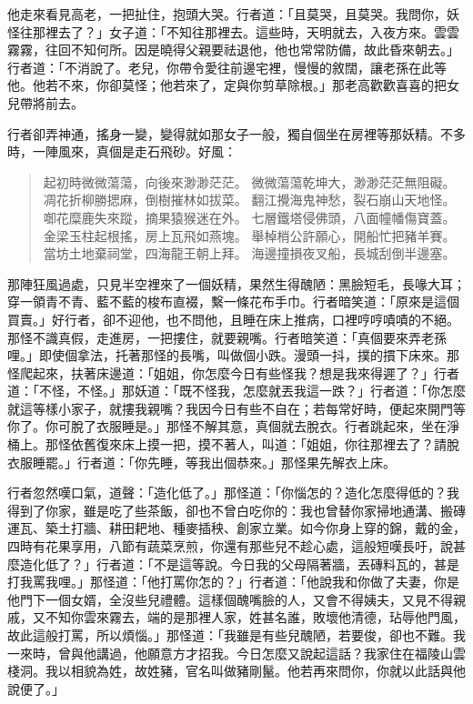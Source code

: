 他走來看見高老，一把扯住，抱頭大哭。行者道：「且莫哭，且莫哭。我問你，妖怪往那裡去了？」女子道：「不知往那裡去。這些時，天明就去，入夜方來。雲雲霧霧，往回不知何所。因是曉得父親要祛退他，他也常常防備，故此昏來朝去。」行者道：「不消說了。老兒，你帶令愛往前邊宅裡，慢慢的敘闊，讓老孫在此等他。他若不來，你卻莫怪；他若來了，定與你剪草除根。」那老高歡歡喜喜的把女兒帶將前去。

行者卻弄神通，搖身一變，變得就如那女子一般，獨自個坐在房裡等那妖精。不多時，一陣風來，真個是走石飛砂。好風：
\begin{quote}
起初時微微蕩蕩，向後來渺渺茫茫。
微微蕩蕩乾坤大，渺渺茫茫無阻礙。
凋花折柳勝揌麻，倒樹摧林如拔菜。
翻江攪海鬼神愁，裂石崩山天地怪。
啣花糜鹿失來蹤，摘果猿猴迷在外。
七層鐵塔侵佛頭，八面幢幡傷寶蓋。
金梁玉柱起根搖，房上瓦飛如燕塊。
舉棹梢公許願心，開船忙把豬羊賽。
當坊土地棄祠堂，四海龍王朝上拜。
海邊撞損夜叉船，長城刮倒半邊塞。
\end{quote}

那陣狂風過處，只見半空裡來了一個妖精，果然生得醜陋：黑臉短毛，長喙大耳；穿一領青不青、藍不藍的梭布直裰，繫一條花布手巾。行者暗笑道：「原來是這個買賣。」好行者，卻不迎他，也不問他，且睡在床上推病，口裡哼哼嘖嘖的不絕。那怪不識真假，走進房，一把摟住，就要親嘴。行者暗笑道：「真個要來弄老孫哩。」即使個拿法，托著那怪的長嘴，叫做個小跌。漫頭一抖，撲的摜下床來。那怪爬起來，扶著床邊道：「姐姐，你怎麼今日有些怪我？想是我來得遲了？」行者道：「不怪，不怪。」那妖道：「既不怪我，怎麼就丟我這一跌？」行者道：「你怎麼就這等樣小家子，就摟我親嘴？我因今日有些不自在；若每常好時，便起來開門等你了。你可脫了衣服睡是。」那怪不解其意，真個就去脫衣。行者跳起來，坐在淨桶上。那怪依舊復來床上摸一把，摸不著人，叫道：「姐姐，你往那裡去了？請脫衣服睡罷。」行者道：「你先睡，等我出個恭來。」那怪果先解衣上床。

行者忽然嘆口氣，道聲：「造化低了。」那怪道：「你惱怎的？造化怎麼得低的？我得到了你家，雖是吃了些茶飯，卻也不曾白吃你的：我也曾替你家掃地通溝、搬磚運瓦、築土打牆、耕田耙地、種麥插秧、創家立業。如今你身上穿的錦，戴的金，四時有花果享用，八節有蔬菜烹煎，你還有那些兒不趁心處，這般短嘆長吁，說甚麼造化低了？」行者道：「不是這等說。今日我的父母隔著牆，丟磚料瓦的，甚是打我罵我哩。」那怪道：「他打罵你怎的？」行者道：「他說我和你做了夫妻，你是他門下一個女婿，全沒些兒禮體。這樣個醜嘴臉的人，又會不得姨夫，又見不得親戚，又不知你雲來霧去，端的是那裡人家，姓甚名誰，敗壞他清德，玷辱他門風，故此這般打罵，所以煩惱。」那怪道：「我雖是有些兒醜陋，若要俊，卻也不難。我一來時，曾與他講過，他願意方才招我。今日怎麼又說起這話？我家住在福陵山雲棧洞。我以相貌為姓，故姓豬，官名叫做豬剛鬣。他若再來問你，你就以此話與他說便了。」

